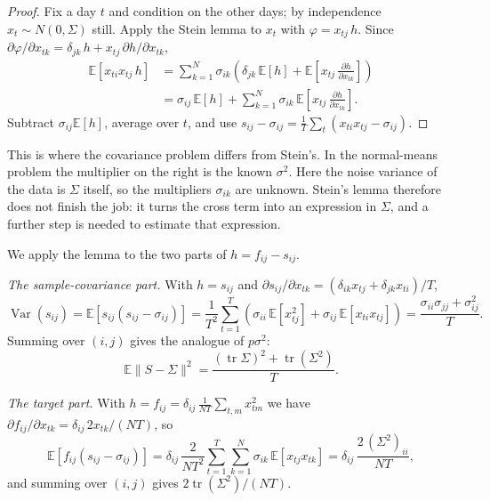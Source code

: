 \begin{proof}
Fix a day $t$ and condition on the other days; by independence $x_t \sim N(0, \Sigma)$ still. Apply the Stein lemma to $x_t$ with $\varphi = x_{tj}\, h$. Since $\partial\varphi/\partial x_{tk} = \delta_{jk}\, h + x_{tj}\, \partial h/\partial x_{tk}$,
\begin{align*}
  \mathbb{E}\left[ x_{ti}x_{tj}\, h \right]
  &= \sum_{k=1}^N \sigma_{ik} \left( \delta_{jk}\, \mathbb{E}[h] + \mathbb{E}\left[ x_{tj}\, \frac{\partial h}{\partial x_{tk}} \right] \right) \\
  &= \sigma_{ij}\, \mathbb{E}[h] + \sum_{k=1}^N \sigma_{ik}\, \mathbb{E}\left[ x_{tj}\, \frac{\partial h}{\partial x_{tk}} \right].
\end{align*}
Subtract $\sigma_{ij}\mathbb{E}[h]$, average over $t$, and use $s_{ij} - \sigma_{ij} = \frac{1}{T}\sum_t (x_{ti}x_{tj} - \sigma_{ij})$.
\end{proof}

This is where the covariance problem differs from Stein's. In the normal-means problem the multiplier on the right is the known $\sigma^2$. Here the noise variance of the data is $\Sigma$ itself, so the multipliers $\sigma_{ik}$ are unknown. Stein's lemma therefore does not finish the job: it turns the cross term into an expression in $\Sigma$, and a further step is needed to estimate that expression.

We apply the lemma to the two parts of $h = f_{ij} - s_{ij}$.

\emph{The sample-covariance part.} With $h = s_{ij}$ and $\partial s_{ij}/\partial x_{tk} = (\delta_{ik}x_{tj} + \delta_{jk}x_{ti})/T$,
\[
  \operatorname{Var}(s_{ij}) = \mathbb{E}\left[ s_{ij}(s_{ij} - \sigma_{ij}) \right]
  = \frac{1}{T^2}\sum_{t=1}^T \left( \sigma_{ii}\,\mathbb{E}[x_{tj}^2] + \sigma_{ij}\,\mathbb{E}[x_{ti}x_{tj}] \right)
  = \frac{\sigma_{ii}\sigma_{jj} + \sigma_{ij}^2}{T}.
\]
Summing over $(i,j)$ gives the analogue of $p\sigma^2$:
\[
  \mathbb{E}\|S - \Sigma\|^2 = \frac{(\operatorname{tr}\Sigma)^2 + \operatorname{tr}(\Sigma^2)}{T}.
\]

\emph{The target part.} With $h = f_{ij} = \delta_{ij}\, \frac{1}{NT}\sum_{t,m} x_{tm}^2$ we have $\partial f_{ij}/\partial x_{tk} = \delta_{ij}\, 2x_{tk}/(NT)$, so
\[
  \mathbb{E}\left[ f_{ij}(s_{ij} - \sigma_{ij}) \right]
  = \delta_{ij}\, \frac{2}{NT^2}\sum_{t=1}^T \sum_{k=1}^N \sigma_{ik}\, \mathbb{E}[x_{tj}x_{tk}]
  = \delta_{ij}\, \frac{2\,(\Sigma^2)_{ii}}{NT},
\]
and summing over $(i,j)$ gives $2\operatorname{tr}(\Sigma^2)/(NT)$.

